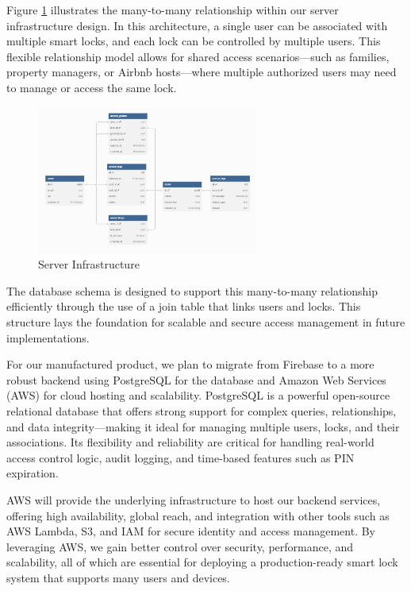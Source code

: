 Figure \ref{fig:serverInfrasture} illustrates the many-to-many relationship within our server infrastructure design. In this architecture, a single user can be associated with multiple smart locks, and each lock can be controlled by multiple users. This flexible relationship model allows for shared access scenarios—such as families, property managers, or Airbnb hosts—where multiple authorized users may need to manage or access the same lock.

\begin{figure}[!ht]
    \centering
    \includegraphics[width=0.65\textwidth]{img/serverInfrastructure.png}
    \caption{Server Infrastructure}
    \label{fig:serverInfrasture}
\end{figure}

The database schema is designed to support this many-to-many relationship efficiently through the use of a join table that links users and locks. This structure lays the foundation for scalable and secure access management in future implementations.

For our manufactured product, we plan to migrate from Firebase to a more robust backend using PostgreSQL for the database and Amazon Web Services (AWS) for cloud hosting and scalability. PostgreSQL is a powerful open-source relational database that offers strong support for complex queries, relationships, and data integrity—making it ideal for managing multiple users, locks, and their associations. Its flexibility and reliability are critical for handling real-world access control logic, audit logging, and time-based features such as PIN expiration.

AWS will provide the underlying infrastructure to host our backend services, offering high availability, global reach, and integration with other tools such as AWS Lambda, S3, and IAM for secure identity and access management. By leveraging AWS, we gain better control over security, performance, and scalability, all of which are essential for deploying a production-ready smart lock system that supports many users and devices.

